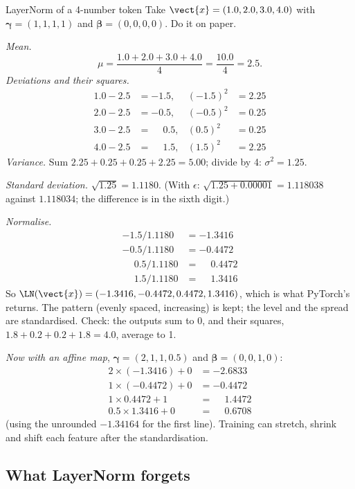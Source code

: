 \begin{worked}[label={we:block:ln}]{LayerNorm of a 4-number token}
Take $\vect{x} = (1.0, 2.0, 3.0, 4.0)$ with $\boldsymbol\gamma = (1,1,1,1)$ and
$\boldsymbol\beta = (0,0,0,0)$. Do it on paper.

\emph{Mean.}
\[
  \mu = \frac{1.0 + 2.0 + 3.0 + 4.0}{4} = \frac{10.0}{4} = 2.5 .
\]
\emph{Deviations and their squares.}
\begin{align*}
  1.0 - 2.5 &= -1.5, & (-1.5)^2 &= 2.25\\
  2.0 - 2.5 &= -0.5, & (-0.5)^2 &= 0.25\\
  3.0 - 2.5 &= \phantom{-}0.5, & (0.5)^2 &= 0.25\\
  4.0 - 2.5 &= \phantom{-}1.5, & (1.5)^2 &= 2.25
\end{align*}
\emph{Variance.} Sum $2.25 + 0.25 + 0.25 + 2.25 = 5.00$; divide by 4: $\sigma^2 = 1.25$.

\emph{Standard deviation.} $\sqrt{1.25} = 1.1180$. (With $\epsilon$:
$\sqrt{1.25 + 0.00001} = 1.118038$ against $1.118034$; the difference is in the sixth digit.)

\emph{Normalise.}
\begin{align*}
  -1.5/1.1180 &= -1.3416\\
  -0.5/1.1180 &= -0.4472\\
  \phantom{-}0.5/1.1180 &= \phantom{-}0.4472\\
  \phantom{-}1.5/1.1180 &= \phantom{-}1.3416
\end{align*}
So $\LN(\vect{x}) = (-1.3416, -0.4472, 0.4472, 1.3416)$, which is what PyTorch's
 returns\tagC. The pattern (evenly spaced, increasing) is kept; the level
and the spread are standardised. Check: the outputs sum to 0, and their squares,
$1.8 + 0.2 + 0.2 + 1.8 = 4.0$, average to 1.

\emph{Now with an affine map}, $\boldsymbol\gamma = (2, 1, 1, 0.5)$ and
$\boldsymbol\beta = (0, 0, 1, 0)$:
\begin{align*}
  2\times(-1.3416) + 0 &= -2.6833\\
  1\times(-0.4472) + 0 &= -0.4472\\
  1\times0.4472 + 1 &= \phantom{-}1.4472\\
  0.5\times1.3416 + 0 &= \phantom{-}0.6708
\end{align*}
(using the unrounded $-1.34164$ for the first line). Training can stretch, shrink and shift each
feature after the standardisation.
\end{worked}

\subsection{What LayerNorm forgets}

